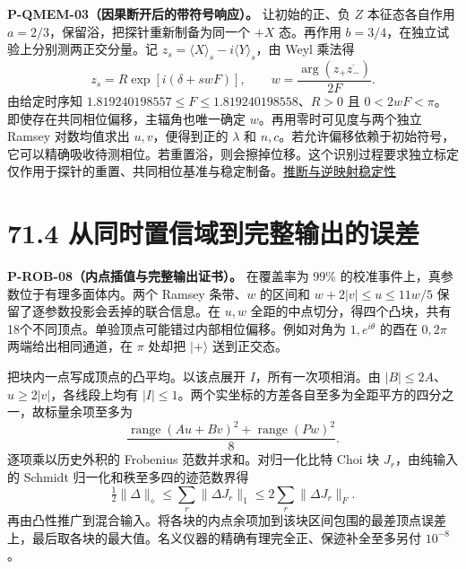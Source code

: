 \documentclass[
  11pt,
  oneside]{book}
\begin{document}
\protect\hypertarget{p-qmem-03}{}{}

\textbf{P-QMEM-03（因果断开后的带符号响应）。} 让初始的正、负 \(Z\)
本征态各自作用 \(a=2/3\)，保留浴，把探针重新制备为同一个 \(+X\)
态。再作用 \(b=3/4\)，在独立试验上分别测两正交分量。记
\(z_s=\langle X\rangle_s-i\langle Y\rangle_s\)，由 Weyl 乘法得 \[
z_s=R\exp[i(\delta+s wF)],\qquad w=\frac{\arg(z_+\overline{z_-})}{2F}.
\] 由给定时序知 \(1.819240198557\le F\le1.819240198558\)、\(R>0\) 且
\(0<2wF<\pi\)。即使存在共同相位偏移，主辐角也唯一确定
\(w\)。再用零时可见度与两个独立 Ramsey 对数均值求出 \(u,v\)，便得到正的
\(\lambda\) 和
\(n,c\)。若允许偏移依赖于初始符号，它可以精确吸收待测相位。若重置浴，则会擦掉位移。这个识别过程要求独立标定仅作用于探针的重置、共同相位基准与稳定制备。\href{../correlated_bath/inference/INFERENCE.md}{推断与逆映射稳定性}

\section{71.4 从同时置信域到完整输出的误差}

\protect\hypertarget{p-rob-08}{}{}

\textbf{P-ROB-08（内点插值与完整输出证书）。} 在覆盖率为 99\%
的校准事件上，真参数位于有理多面体内。两个 Ramsey 条带、\(w\) 的区间和
\(w+2|v|\le u\le11w/5\) 保留了逐参数投影会丢掉的联合信息。在 \(u,w\)
全距的中点切分，得四个凸块，共有18个不同顶点。单验顶点可能错过内部相位偏移。例如对角为
\(1,e^{i\theta}\) 的酉在 \(0,2\pi\) 两端给出相同通道，在 \(\pi\) 处却把
\(|+\rangle\) 送到正交态。

把块内一点写成顶点的凸平均。以该点展开 \(I\)，所有一次项相消。由
\(|B|\le2A\)、\(u\ge2|v|\)，各线段上均有
\(|I|\le1\)。两个实坐标的方差各自至多为全距平方的四分之一，故标量余项至多为
\[
\frac{\operatorname{range}(Au+Bv)^2+\operatorname{range}(Pw)^2}{8}.
\] 逐项乘以历史外积的 Frobenius 范数并求和。对归一化比特 Choi 块
\(J_r\)，由纯输入的 Schmidt 归一化和秩至多四的迹范数界得 \[
\tfrac12\|\Delta\|_\diamond\le\sum_r\|\Delta J_r\|_1\le2\sum_r\|\Delta J_r\|_F .
\]
再由凸性推广到混合输入。将各块的内点余项加到该块区间包围的最差顶点误差上，最后取各块的最大值。名义仪器的精确有理完全正、保迹补全至多另付
\(10^{-8}\)。
\end{document}
